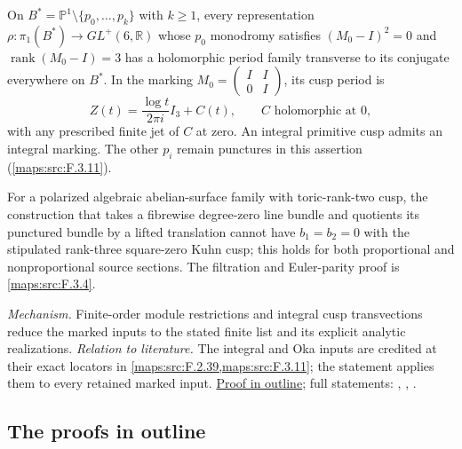 On $B^*=\mathbb P^1\setminus\{p_0,\ldots,p_k\}$ with $k\ge1$,
every representation $\rho:\pi_1(B^*)\to GL^+(6,\mathbb R)$
whose $p_0$ monodromy satisfies $(M_0-I)^2=0$ and
$\operatorname{rank}(M_0-I)=3$ has a holomorphic period family
transverse to its conjugate everywhere on $B^*$. In the marking
$M_0=\left(\begin{smallmatrix}I&I\\0&I\end{smallmatrix}\right)$,
its cusp period is
\[
 Z(t)=\frac{\log t}{2\pi i}I_3+C(t),\qquad C\text{ holomorphic at }0,
\]
with any prescribed finite jet of $C$ at zero. An integral primitive
cusp admits an integral marking. The other $p_i$ remain punctures
in this assertion (\cref{maps:src:F.3.11}).

For a polarized algebraic abelian-surface family with toric-rank-two
cusp, the construction that takes a fibrewise degree-zero line bundle
and quotients its punctured bundle by a lifted translation cannot
have $b_1=b_2=0$ with the stipulated rank-three square-zero Kuhn
cusp; this holds for both proportional and nonproportional source
sections. The filtration and Euler-parity proof is
\cref{maps:src:F.3.4}.

\textit{Mechanism.} Finite-order module restrictions and integral cusp transvections reduce the marked inputs to the stated finite list and its explicit analytic realizations.
\textit{Relation to literature.} The integral and Oka inputs are credited at their exact locators in \cref{maps:src:F.2.39,maps:src:F.3.11}; the statement applies them to every retained marked input.
\hyperlink{outline-V-F}{Proof in outline}; full statements: , , .

\subsection{The proofs in outline}
\hypertarget{outline-V-A}{}
